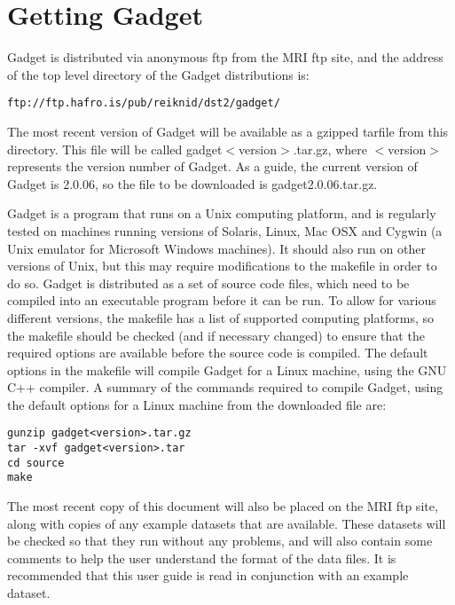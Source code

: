 \documentclass [a4paper, 10pt]{book}
\begin{document}
\section{Getting Gadget}\label{sec:gettinggadget}
Gadget is distributed via anonymous ftp from the MRI ftp site, and the address of the top level directory of the Gadget distributions is:

{\small\begin{verbatim}
ftp://ftp.hafro.is/pub/reiknid/dst2/gadget/
\end{verbatim}}

The most recent version of Gadget will be available as a gzipped tarfile from this directory.  This file will be called gadget$<$version$>$.tar.gz, where $<$version$>$ represents the version number of Gadget.  As a guide, the current version of Gadget is 2.0.06, so the file to be downloaded is gadget2.0.06.tar.gz.

\bigskip
Gadget is a program that runs on a Unix computing platform, and is regularly tested on machines running versions of Solaris, Linux, Mac OSX and Cygwin (a Unix emulator for Microsoft Windows machines).  It should also run on other versions of Unix, but this may require modifications to the makefile in order to do so.  Gadget is distributed as a set of source code files, which need to be compiled into an executable program before it can be run.  To allow for various different versions, the makefile has a list of supported computing platforms, so the makefile should be checked (and if necessary changed) to ensure that the required options are available before the source code is compiled.  The default options in the makefile will compile Gadget for a Linux machine, using the GNU C++ compiler.  A summary of the commands required to compile Gadget, using the default options for a Linux machine from the downloaded file are:

{\small\begin{verbatim}
gunzip gadget<version>.tar.gz
tar -xvf gadget<version>.tar
cd source
make
\end{verbatim}}

The most recent copy of this document will also be placed on the MRI ftp site, along with copies of any example datasets that are available.  These datasets will be checked so that they run without any problems, and will also contain some comments to help the user understand the format of the data files.  It is recommended that this user guide is read in conjunction with an example dataset.
\end{document}
